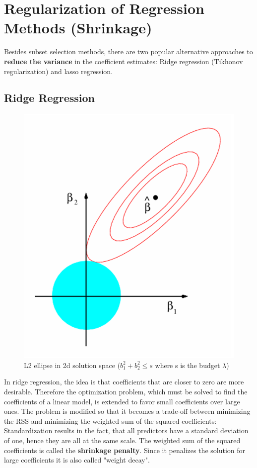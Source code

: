 \documentclass[../Main.tex]{subfiles}
\begin{document}
\section{Regularization of Regression Methods (Shrinkage)}
Besides subset selection 
methods, there are two popular 
alternative approaches to \textbf{reduce 
the variance} in the coefficient 
estimates: Ridge regression (Tikhonov 
regularization) and lasso regression.

\subsection{Ridge Regression}

\begin{figure}[H]
    \centering
    \includegraphics[width=0.35\linewidth]{Images/l2-ellipse.png}
    \caption{L2 ellipse in 2d solution space (\(b_1^2+b_2^2 \leq s\) where s is the budget \(\lambda\))}
\end{figure}

In ridge regression, the idea is that 
coefficients that are closer to zero 
are more desirable.
Therefore the optimization problem, which 
must be solved to find the coefficients of a 
linear model, is extended to favor small 
coefficients over large ones.
The problem is modified so that 
it becomes a trade-off between 
minimizing the RSS and minimizing 
the weighted sum of the squared 
coefficients:
Standardization results in the fact, that 
all predictors have a standard deviation of 
one, hence they are all at the same scale.
The weighted sum of the squared coefficients is called the \textbf{shrinkage penalty}.
Since it penalizes the solution for large coefficients it is also called "weight decay".
\end{document}
